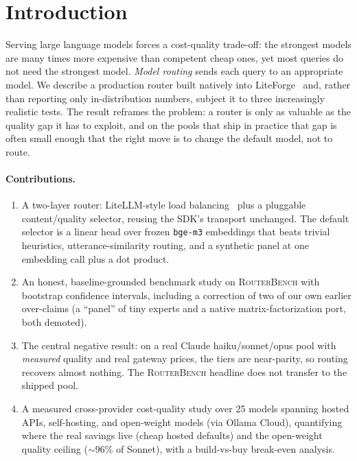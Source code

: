 \documentclass[11pt]{article}
\newcommand{\rb}{\textsc{RouterBench}}
\newcommand{\code}[1]{\texttt{\small #1}}
\newcommand{\NPROV}{25}            %
\begin{document}
\section{Introduction}
Serving large language models forces a cost-quality trade-off: the strongest models are
many times more expensive than competent cheap ones, yet most queries do not need the
strongest model. \emph{Model routing} sends each query to an appropriate model. We
describe a production router built natively into LiteForge~\citep{liteforge} and, rather
than reporting only in-distribution numbers, subject it to three increasingly realistic
tests. The result reframes the problem: a router is only as valuable as the quality gap
it has to exploit, and on the pools that ship in practice that gap is often small enough
that the right move is to change the default model, not to route.

\paragraph{Contributions.}
\begin{enumerate}[leftmargin=1.4em,itemsep=2pt]
\item A two-layer router: LiteLLM-style load balancing~\citep{litellm} plus a pluggable
content/quality selector, reusing the SDK's transport unchanged. The default selector is
a linear head over frozen \code{bge-m3} embeddings that beats trivial heuristics,
utterance-similarity routing, and a synthetic panel at one embedding call plus a dot
product.
\item An honest, baseline-grounded benchmark study on \rb{} with bootstrap confidence
intervals, including a correction of two of our own earlier over-claims (a ``panel'' of
tiny experts and a native matrix-factorization port, both demoted).
\item The central negative result: on a real Claude haiku/sonnet/opus pool with
\emph{measured} quality and real gateway prices, the tiers are near-parity, so routing
recovers almost nothing. The \rb{} headline does not transfer to the shipped pool.
\item A measured cross-provider cost-quality study over \NPROV{} models spanning hosted
APIs, self-hosting, and open-weight models (via Ollama Cloud), quantifying where the
real savings live (cheap hosted defaults) and the open-weight quality ceiling
($\sim$96\% of Sonnet), with a build-vs-buy break-even analysis.
\end{enumerate}
\end{document}
